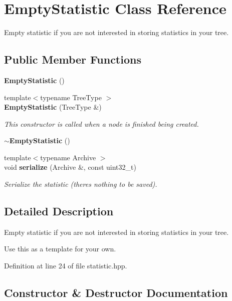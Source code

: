 \section{Empty\+Statistic Class Reference}
\label{classmlpack_1_1tree_1_1EmptyStatistic}


Empty statistic if you are not interested in storing statistics in your tree.  


\subsection*{Public Member Functions}
\begin{DoxyCompactItemize}
\item 
\textbf{ Empty\+Statistic} ()
\item 
{\footnotesize template$<$typename Tree\+Type $>$ }\\\textbf{ Empty\+Statistic} (Tree\+Type \&)
\begin{DoxyCompactList}\small\item\em This constructor is called when a node is finished being created. \end{DoxyCompactList}\item 
\textbf{ $\sim$\+Empty\+Statistic} ()
\item 
{\footnotesize template$<$typename Archive $>$ }\\void \textbf{ serialize} (Archive \&, const uint32\+\_\+t)
\begin{DoxyCompactList}\small\item\em Serialize the statistic (there\textquotesingle{}s nothing to be saved). \end{DoxyCompactList}\end{DoxyCompactItemize}


\subsection{Detailed Description}
Empty statistic if you are not interested in storing statistics in your tree. 

Use this as a template for your own. 

Definition at line 24 of file statistic.\+hpp.



\subsection{Constructor \& Destructor Documentation}
\mbox{\label{classmlpack_1_1tree_1_1EmptyStatistic_a4af70266f8b5ec22f8f7f52e7c3e6e3f}} 
